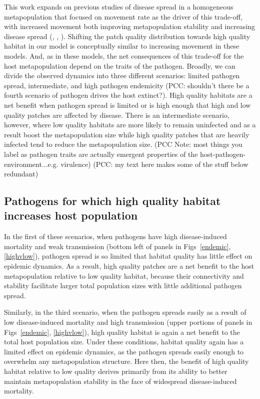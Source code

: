 \documentclass{article}
\begin{document}
This work expands on previous studies of disease spread in a homogeneous metapopulation that focused on movement rate as the driver of this trade-off, with increased movement both improving metapopulation stability and increasing disease spread (\cite{Hess1996}, \cite{Gog2002}, \cite{Park2012}).  
Shifting the patch quality distribution towards high quality habitat in our model is conceptually similar to increasing movement in these models.
And, as in these models, the net consequences of this trade-off for the host metapopulation depend on the traits of the pathogen.
Broadly, we can divide the observed dynamics into three different scenarios: limited pathogen spread, intermediate, and high pathogen endemicity (PCC: shouldn't there be a fourth scenario of pathogen drives the host extinct?). High quality habitats are a net benefit when pathogen spread is limited or is high enough that high and low quality patches are affected by disease. There is an intermediate scenario, however, where low quality habitats are more likely to remain uninfected and as a result boost the metapopulation size while high quality patches that are heavily infected tend to reduce the metapopulation size. (PCC Note: most things you label as pathogen traits are actually emergent properties of the host-pathogen-environment...e.g. virulence)  (PCC: my text here makes some of the stuff below redundant)

\subsection*{Pathogens for which high quality habitat increases host population}

In the first of these scenarios, when pathogens have high disease-induced mortality and weak transmission (bottom left of panels in Figs~\ref{endemic}, \ref{highvlow}), pathogen spread is so limited that habitat quality has little effect on epidemic dynamics.
As a result, high quality patches are a net benefit to the host metapopulation relative to low quality habitat, because their connectivity and stability facilitate larger total population sizes with little additional pathogen spread.

Similarly, in the third scenario, when the pathogen spreads easily as a result of low disease-induced mortality and high transmission (upper portions of panels in Figs~\ref{endemic}, \ref{highvlow}), high quality habitat is again a net benefit to the total host population size.  
Under these conditions, habitat quality again has a limited effect on epidemic dynamics, as the pathogen spreads easily enough to overwhelm any metapopulation structure.
Here then, the benefit of high quality habitat relative to low quality derives primarily from its ability to better maintain metapopulation stability in the face of widespread disease-induced mortality.
\end{document}
